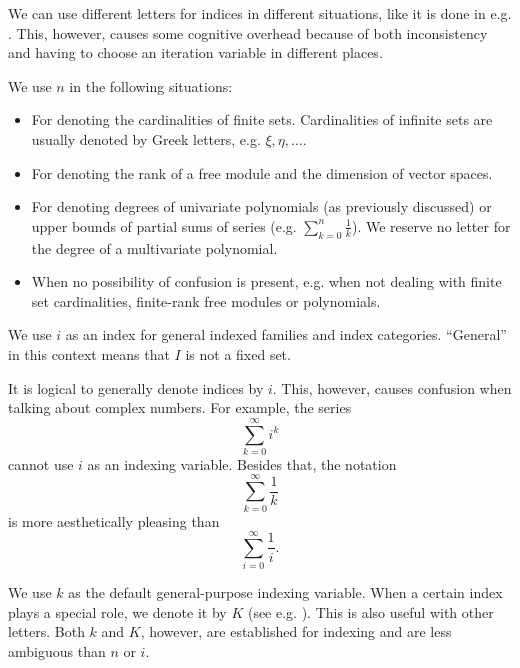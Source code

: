 \begin{enumerate}
  We can use different letters for indices in different situations, like it is done in e.g. \cite{Rudin1991}. This, however, causes some cognitive overhead because of both inconsistency and having to choose an iteration variable in different places.

  We use \( n \) in the following situations:
  \begin{itemize}
    \item For denoting the cardinalities of finite sets. Cardinalities of infinite sets are usually denoted by Greek letters, e.g. \( \xi, \eta, \ldots \).

    \item For denoting the rank of a free module and the dimension of vector spaces.

    \item For denoting degrees of univariate polynomials (as previously discussed) or upper bounds of partial sums of series (e.g. \( \sum_{k=0}^n \frac 1 k \)). We reserve no letter for the degree of a multivariate polynomial.

    \item When no possibility of confusion is present, e.g. when not dealing with finite set cardinalities, finite-rank free modules or polynomials.
  \end{itemize}

   We use \( i \) as an index for general indexed families and index categories. \enquote{General} in this context means that \( I \) is not a fixed set.

  It is logical to generally denote indices by \( i \). This, however, causes confusion when talking about complex numbers. For example, the series
  \begin{equation*}
    \sum_{k=0}^\infty i^k
  \end{equation*}
  cannot use \( i \) as an indexing variable. Besides that, the notation
  \begin{equation*}
    \sum_{k=0}^\infty \frac 1 k
  \end{equation*}
  is more aesthetically pleasing than
  \begin{equation*}
    \sum_{i=0}^\infty \frac 1 i.
  \end{equation*}

   We use \( k \) as the default general-purpose indexing variable. When a certain index plays a special role, we denote it by \( K \) (see e.g. ). This is also useful with other letters. Both \( k \) and \( K \), however, are established for indexing and are less ambiguous than \( n \) or \( i \).


\end{enumerate}
